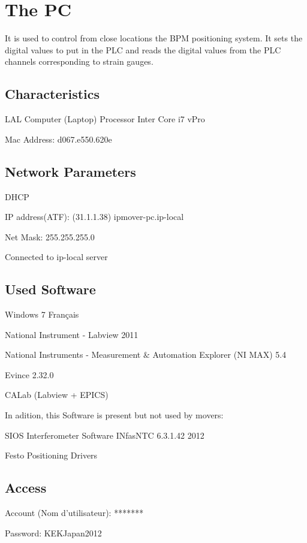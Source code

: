 \section{The PC}
It is used to control from close locations the BPM positioning system. It sets the digital values to put in the PLC and reads the digital values from the PLC channels corresponding to strain gauges.\par
\subsection{Characteristics}
LAL Computer (Laptop)
Processor Inter Core i7 vPro\par
Mac Address: d067.e550.620e\par

\subsection{Network Parameters}
DHCP\par
IP address(ATF): (31.1.1.38) ipmover-pc.ip-local\par
Net Mask: 255.255.255.0\par
Connected to ip-local server\par

\subsection{Used Software}
Windows 7 Français\par
National Instrument - Labview 2011\par
National Instruments - Measurement $\&$ Automation Explorer (NI MAX) 5.4\par
Evince 2.32.0\par
CALab (Labview + EPICS) \cite{CALab}\par
In adition, this Software is present but not used by movers:\par
SIOS Interferometer Software INfasNTC 6.3.1.42 2012\par
Festo Positioning Drivers\par

\subsection{Access}
Account (Nom d'utilisateur): *******\par
Password: KEKJapan2012\par

